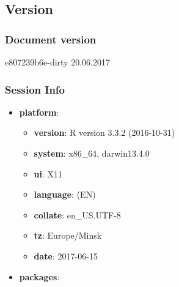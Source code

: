 \documentclass[]{article}
\providecommand{\tightlist}{%
  \setlength{\itemsep}{0pt}\setlength{\parskip}{0pt}}
\begin{document}
\subsection{Version}\label{version}

\subsubsection{Document version}\label{document-version}

e807239b6e-dirty 20.06.2017

\subsubsection{Session Info}\label{session-info}

\begin{itemize}
\item
  \textbf{platform}:

  \begin{itemize}
  \tightlist
  \item
    \textbf{version}: R version 3.3.2 (2016-10-31)
  \item
    \textbf{system}: x86\_64, darwin13.4.0
  \item
    \textbf{ui}: X11
  \item
    \textbf{language}: (EN)
  \item
    \textbf{collate}: en\_US.UTF-8
  \item
    \textbf{tz}: Europe/Minsk
  \item
    \textbf{date}: 2017-06-15
  \end{itemize}
\item
  \textbf{packages}:


\end{itemize}
\end{document}
